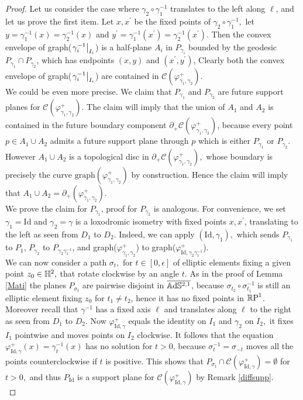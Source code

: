\begin{proof}
    Let us consider the case where $\gamma_2\circ\gamma_1^{-1}$ translates to the left along $\ell$, and let us prove the first item. Let $x,x^{\prime}$ be the fixed points of $\gamma_2\circ\gamma_1^{-1},$ let $y=\gamma_1^{-1}(x)=\gamma_2^{-1}(x)$ and $y^{\prime}=\gamma_1^{-1}(x^{\prime})=\gamma_2^{-1}(x^{\prime})$. Then the convex envelope of graph($\restr{\gamma_i^{-1}}{I_i}$) is a half-plane $A_i$ in $P_{\gamma_i}$ bounded by the geodesic $P_{\gamma_1}\cap P_{\gamma_2}$, which has endpoints $(x,y)$ and $(x^{\prime} ,y^{\prime})$, Clearly both the convex envelope of graph($\restr{\gamma_i^{-1}}{I_i}$) are contained in $\mathcal{C}(\varphi_{\gamma_1,\gamma_2}^{+}).$\\
    We could be even more precise. We claim that $P_{\gamma_1}$ and $P_{\gamma_2}$ are future support planes for $\mathcal{C}(\varphi_{\gamma_1,\gamma_2}^{+})$. The claim will imply that the union of $A_1$ and $A_2$ is contained in the future boundary component $\partial_+\mathcal{C}(\varphi_{\gamma_1,\gamma_2}^{+})$, because every point $p\in A_1\cup A_2$ admits a future support plane through $p$ which is either $P_{\gamma_1}$ or $P_{\gamma_2}$. However $A_1\cup A_2$ is a topological disc in $\partial_+\mathcal{C}(\varphi_{\gamma_1,\gamma_2}^{+}),$ whose boundary is precisely the curve $\text{graph}(\varphi_{\gamma_1,\gamma_2}^{+})$ by construction. Hence the claim will imply that $A_1\cup A_2=\partial_+(\varphi_{\gamma_1,\gamma_2}^{+}).$\\
    We prove the claim for $P_{\gamma_1}$, proof for $P_{\gamma_2}$ is analogous. For convenience, we set $\gamma_1=\text{Id}$ and $\gamma_2=\gamma$ is a loxodromic isometry with fixed points $x,x^{\prime}$, translating to the left as seen from $D_1$ to $D_2$. Indeed, we can apply $(\text{Id},\gamma_1),$ which sends $P_{\gamma_1}$ to $P_1$, $P_{\gamma_2}$ to $P_{\gamma_2\gamma_1^{-1}}$, and graph($\varphi_{\gamma_1,\gamma_2}^+$) to graph($\varphi_{\text{Id},\gamma_2\gamma_1^{-1}}^+$). \\
    We can now consider a path $\sigma_t,$ for $t\in[0,\epsilon]$ of elliptic elements fixing a given point $z_0\in\H^2,$ that rotate clockwise by an angle $t.$ As in the proof of Lemma \ref{Mati} the planes $P_{\sigma_t}$ are pairwise disjoint in $\overline{\A^{2,1}}$, because $\sigma_{t_2}\circ\sigma_{t_1}^{-1}$ is still an elliptic element fixing $z_0$ for $t_1\neq t_2$, hence it has no fixed points in $\S$. Moreover recall that $\gamma^{-1}$ has a fixed axis $\ell$ and translates along $\ell$ to the right as seen from $D_1$ to $D_2$. Now $\varphi_{\text{Id},\gamma}^+$ equals the identity on $I_1$ and $\gamma_2$ on $I_2,$ it fixes $I_1$ pointwise and moves points on $I_2$ clockwise. It follows that the equation $\varphi_{\text{Id},\gamma}^+(x)=\gamma_t^{-1}(x)$ has no solution for $t>0$, because $\sigma_{t}^{-1}=\sigma_{-t}$ moves all the points counterclockwise if $t$ is positive. This shows that $P_{\sigma_t}\cap\mathcal{C}(\varphi^+_{\text{Id},\gamma})=\emptyset$ for $t>0,$ and thus $P_{\text{Id}}$ is a support plane for $\mathcal{C}(\varphi^+_{\text{Id},\gamma})$ by Remark \ref{diffsupp}.\\

\end{proof}
